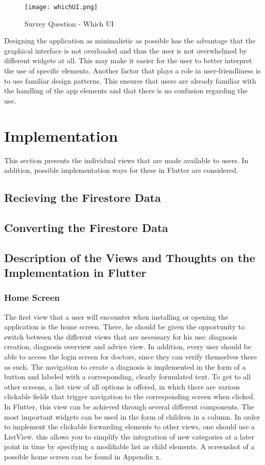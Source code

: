 \begin{figure}[H]
	\centering
	\texttt{[image: whichUI.png]}
	\caption[Survey Question]{Survey Question - Which UI}
\end{figure}
\noindent
Designing the application as minimalistic as possible has the advantage that the graphical interface is not overloaded and thus the user is not overwhelmed by different widgets at all. This may make it easier for the user to better interpret the use of specific elements. Another factor that plays a role in user-friendliness is to use familiar design patterns. This ensures that users are already familiar with the handling of the app elements and that there is no confusion regarding the use. 
\section{Implementation}
This section presents the individual views that are made available to users. In addition, possible implementation ways for these in Flutter are considered.
\subsection{Recieving the Firestore Data}
\subsection{Converting the Firestore Data}
\subsection{Description of the Views and Thoughts on the Implementation in Flutter}
\subsubsection{\textbf{Home Screen}}
The first view that a user will encounter when installing or opening the application is the home screen. There, he should be given the opportunity to switch between the different views that are necessary for his use: diagnosis creation, diagnosis overview and advice view. In addition, every user should be able to access the login screen for doctors, since they can verify themselves there as such. The navigation to create a diagnosis is implemented in the form of a button and labeled with a corresponding, clearly formulated text. To get to all other screens, a list view of all options is offered, in which there are various clickable fields that trigger navigation to the corresponding screen when clicked. In Flutter, this view can be achieved through several different components. The most important widgets can be used in the form of children in a column. In order to implement the clickable forwarding elements to other views, one should use a ListView. this allows you to simplify the integration of new categories at a later point in time by specifying a modifiable list as child elements. A screenshot of a possible home screen can be found in Appendix x.

